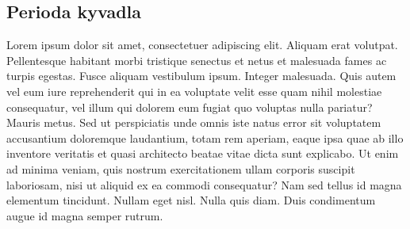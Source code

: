 \subsection{Perioda kyvadla}
\label{sec:Perioda}

 Lorem ipsum dolor sit amet, consectetuer adipiscing elit. Aliquam erat volutpat. Pellentesque habitant morbi tristique senectus et netus et malesuada fames ac turpis egestas. Fusce aliquam vestibulum ipsum. Integer malesuada. Quis autem vel eum iure reprehenderit qui in ea voluptate velit esse quam nihil molestiae consequatur, vel illum qui dolorem eum fugiat quo voluptas nulla pariatur? Mauris metus. Sed ut perspiciatis unde omnis iste natus error sit voluptatem accusantium doloremque laudantium, totam rem aperiam, eaque ipsa quae ab illo inventore veritatis et quasi architecto beatae vitae dicta sunt explicabo. Ut enim ad minima veniam, quis nostrum exercitationem ullam corporis suscipit laboriosam, nisi ut aliquid ex ea commodi consequatur? Nam sed tellus id magna elementum tincidunt. Nullam eget nisl. Nulla quis diam. Duis condimentum augue id magna semper rutrum.





